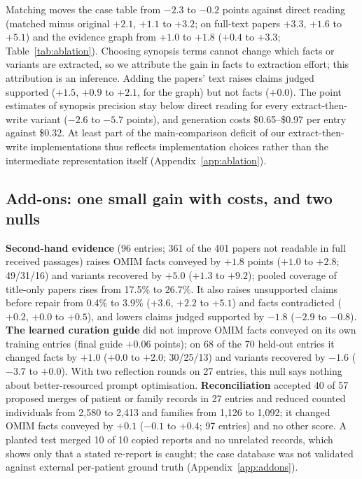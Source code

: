 \documentclass{article} %
\begin{document}
Matching moves the case table from $-2.3$ to $-0.2$ points against direct reading (matched minus original $+2.1$, $+1.1$ to $+3.2$; on full-text papers $+3.3$, $+1.6$ to $+5.1$) and the evidence graph from $+1.0$ to $+1.8$ ($+0.4$ to $+3.3$; Table~\ref{tab:ablation}). Choosing synopsis terms cannot change which facts or variants are extracted, so we attribute the gain in facts to extraction effort; this attribution is an inference. Adding the papers' text raises claims judged supported ($+1.5$, $+0.9$ to $+2.1$, for the graph) but not facts ($+0.0$). The point estimates of synopsis precision stay below direct reading for every extract-then-write variant ($-2.6$ to $-5.7$ points), and generation costs \$0.65--\$0.97 per entry against \$0.32. At least part of the main-comparison deficit of our extract-then-write implementations thus reflects implementation choices rather than the intermediate representation itself (Appendix~\ref{app:ablation}).

\subsection{Add-ons: one small gain with costs, and two nulls}
\label{sec:addons}
\textbf{Second-hand evidence} (96 entries; 361 of the 401 papers not readable in full received passages) raises OMIM facts conveyed by $+1.8$ points ($+1.0$ to $+2.8$; 49/31/16) and variants recovered by $+5.0$ ($+1.3$ to $+9.2$); pooled coverage of title-only papers rises from 17.5\% to 26.7\%. It also raises unsupported claims before repair from 0.4\% to 3.9\% ($+3.6$, $+2.2$ to $+5.1$) and facts contradicted ($+0.2$, $+0.0$ to $+0.5$), and lowers claims judged supported by $-1.8$ ($-2.9$ to $-0.8$). \textbf{The learned curation guide} did not improve OMIM facts conveyed on its own training entries (final guide $+0.06$ points); on 68 of the 70 held-out entries it changed facts by $+1.0$ ($+0.0$ to $+2.0$; 30/25/13) and variants recovered by $-1.6$ ($-3.7$ to $+0.0$). With two reflection rounds on 27 entries, this null says nothing about better-resourced prompt optimisation. \textbf{Reconciliation} accepted 40 of 57 proposed merges of patient or family records in 27 entries and reduced counted individuals from 2,580 to 2,413 and families from 1,126 to 1,092; it changed OMIM facts conveyed by $+0.1$ ($-0.1$ to $+0.4$; 97 entries) and no other score. A planted test merged 10 of 10 copied reports and no unrelated records, which shows only that a stated re-report is caught; the case database was not validated against external per-patient ground truth (Appendix~\ref{app:addons}).
\end{document}
